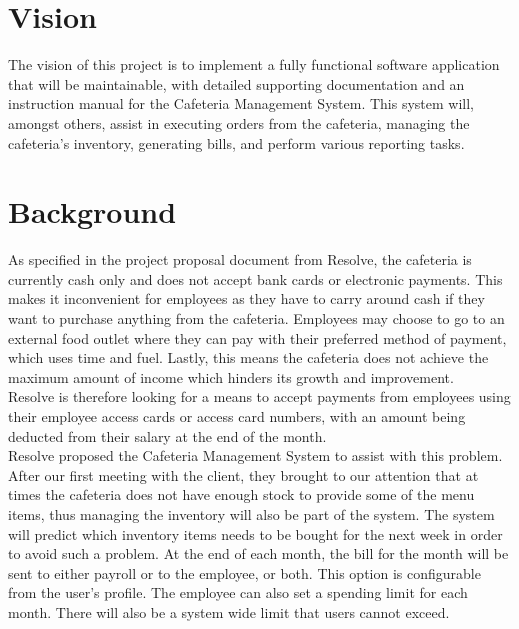 \documentclass[a4paper,12pt]{article}
\begin{document}
\section{Vision}
The vision of this project is to implement a fully functional software application that will be maintainable, with detailed supporting documentation and an instruction manual for the Cafeteria Management System. This system will, amongst others, assist in executing orders from the cafeteria, managing the cafeteria's inventory, generating bills, and perform various reporting tasks. 

\section{Background}
As specified in the project proposal document from Resolve, the cafeteria is currently cash only and does not accept bank cards or electronic payments. This makes it inconvenient for employees as they have to carry around cash if they want to purchase anything from the cafeteria. Employees may choose to go to an external food outlet where they can pay with their preferred method of payment, which uses time and fuel. Lastly, this means the cafeteria does not achieve the maximum amount of income which hinders its growth and improvement.\\

Resolve is therefore looking for a means to accept payments from employees  using their employee access cards or access card numbers, with an amount being deducted from their salary at the end of the month.\\

Resolve proposed the Cafeteria Management System to assist with this problem.
After our first meeting with the client, they brought to our attention that at times the cafeteria does not have enough stock to provide some of the menu items, thus managing the inventory will also be part of the system. The system will predict which inventory items needs to be bought for the next week in order to avoid such a problem. At the end of each month, the bill for the month will be sent to either payroll or to the employee, or both. This option is configurable from the user's profile. The employee can also set a spending limit for each month. There will also be a system wide limit that users cannot exceed.
\end{document}
